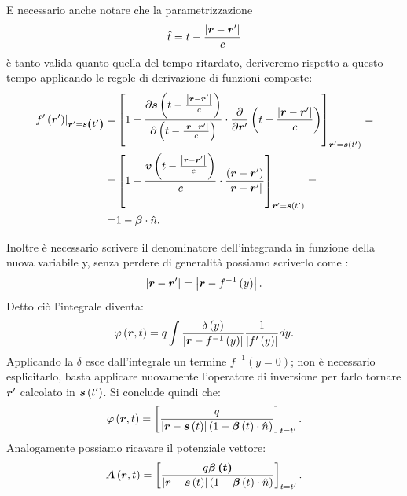E necessario anche notare che la parametrizzazione
\[
\hat{t}=t-\frac{\left| \boldsymbol{r}-\boldsymbol{r}' \right| }{c}
\]
è tanto valida quanto quella del tempo ritardato, deriveremo rispetto a questo tempo applicando le regole di derivazione di funzioni composte:
\begin{align*}
	\left. f'\left( \boldsymbol{r}' \right)\right|_{\boldsymbol{r}'=\boldsymbol{s\left( t' \right) }} =& \left[ 1 - \frac{\partial \boldsymbol{s}\left( t- \frac{\left| \boldsymbol{r}-\boldsymbol{r}' \right| }{c} \right) }{\partial \left( t - \frac{\left| \boldsymbol{r}-\boldsymbol{r}' \right| }{c} \right) } \cdot  
			\frac{\partial}{\partial \boldsymbol{r}'} \left( t- \frac{\left| \boldsymbol{r}-\boldsymbol{r}' \right| }{c} \right) \right]_{\boldsymbol{r}'=\boldsymbol{s}\left( t' \right) } =\\
			=&\left[ 1 - \frac{\boldsymbol{v}\left( t-\frac{\left| \boldsymbol{r}-\boldsymbol{r}' \right| }{c} \right) }{c}\cdot \frac{\left( \boldsymbol{r}-\boldsymbol{r}' \right) }{\left| \boldsymbol{r}-\boldsymbol{r}' \right| }\right]_{\boldsymbol{r}'=\boldsymbol{s}\left( t' \right) } =\\
	=& 1-\boldsymbol{\beta}\cdot \hat{n}
.\end{align*}

Inoltre è necessario scrivere il denominatore dell'integranda in funzione della nuova variabile y, senza perdere di generalità possiamo scriverlo come :
\[
	\left| \boldsymbol{r}-\boldsymbol{r}' \right| = \left| \boldsymbol{r}-f^{-1}\left( y \right)  \right| 
.\] 
Detto ciò l'integrale diventa:
\[
	\varphi\left( \boldsymbol{r}, t \right) = q\int \frac{\delta\left( y \right)}{\left| \boldsymbol{r}-f^{-1}\left( y \right)  \right| } \frac{1}{\left| f'\left( y \right)  \right| }dy 
.\]
Applicando la $\delta$ esce dall'integrale un termine $f^{-1}\left( y=0 \right) $; non è necessario esplicitarlo, basta applicare nuovamente l'operatore di inversione per farlo tornare $\boldsymbol{r}'$ calcolato in $\boldsymbol{s}\left( t' \right) $. Si conclude quindi che:
\[
	\varphi\left( \boldsymbol{r}, t \right) = \left[\frac{q}{\left| \boldsymbol{r}-\boldsymbol{s}\left( t \right)  \right| \left( 1-\boldsymbol{\beta}\left( t \right) \cdot \hat{n} \right) }\right]_{t=t'}
.\] 
Analogamente possiamo ricavare il potenziale vettore:
\[
	\boldsymbol{A}\left( \boldsymbol{r}, t \right) =\left[\frac{q \boldsymbol{\beta\left( t \right) }}{\left| \boldsymbol{r}-\boldsymbol{s}\left( t \right)  \right| \left( 1-\boldsymbol{\beta}\left( t \right) \cdot \hat{n} \right) }\right]_{t=t'}
.\] 

